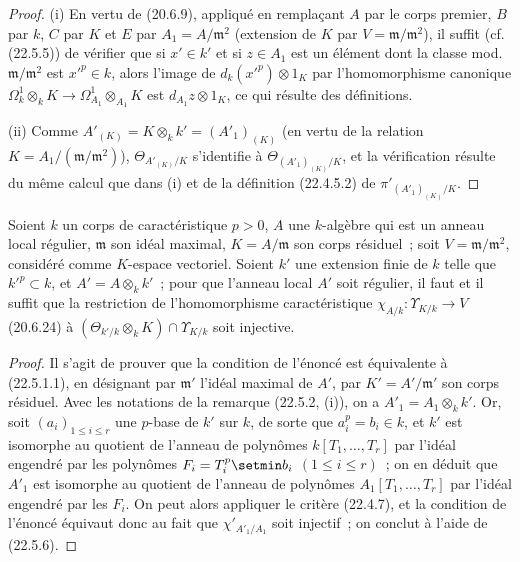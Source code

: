 \begin{proof}
(i) En vertu de (20.6.9), appliqué en remplaçant $A$ par le corps premier, $B$
par $k$, $C$ par $K$ et $E$ par $A_1=A/\mathfrak m^2$ (extension de $K$ par
$V=\mathfrak m/\mathfrak m^2$), il suffit (cf. (22.5.5)) de vérifier que si
$x'\in k'$ et si $z\in A_1$ est un élément dont la classe mod.
$\mathfrak m/\mathfrak m^2$ est $x'^p\in k$, alors l'image de
$d_k(x'^p)\otimes1_K$ par l'homomorphisme canonique
$\Omega^1_k\otimes_kK\longrightarrow\Omega^1_{A_1}\otimes_{A_1}K$ est
$d_{A_1}z\otimes1_K$, ce qui résulte des définitions.

(ii) Comme $A'_{(K)}=K\otimes_kk'=(A'_1)_{(K)}$ (en vertu de la relation
$K=A_1/(\mathfrak m/\mathfrak m^2)$), $\Theta_{A'_{(K)}/K}$ s'identifie à
$\Theta_{(A'_1)_{(K)}/K}$, et la vérification résulte du même calcul que dans
(i) et de la définition (22.4.5.2) de $\pi'_{(A'_1)_{(K)}/K}$.
\end{proof}

\begin{proposition}[22.5.7]
\label{0.22.5.7-fr}
Soient $k$ un corps de caractéristique $p>0$, $A$ une $k$-algèbre qui est un
anneau local régulier, $\mathfrak m$ son idéal maximal, $K=A/\mathfrak m$ son
corps résiduel~; soit $V=\mathfrak m/\mathfrak m^2$, considéré comme
$K$-espace vectoriel. Soient $k'$ une extension finie de $k$ telle que
$k'^p\subset k$, et $A'=A\otimes_kk'$~; pour que l'anneau local $A'$ soit
régulier, il faut et il suffit que la restriction de l'homomorphisme
caractéristique $\chi_{A/k}:\Upsilon_{K/k}\longrightarrow V$ \textup{(20.6.24)} à
$(\Theta_{k'/k}\otimes_kK)\cap\Upsilon_{K/k}$ soit injective.
\end{proposition}

\begin{proof}
Il s'agit de prouver que la condition de l'énoncé est équivalente à
(22.5.1.1), en désignant par $\mathfrak m'$ l'idéal maximal de $A'$, par
$K'=A'/\mathfrak m'$ son corps résiduel. Avec les notations de la remarque
(22.5.2, (i)), on a $A'_1=A_1\otimes_kk'$. Or, soit
$(a_i)_{1\leqslant i\leqslant r}$ une $p$-base de $k'$ sur $k$, de sorte que
$a_i^p=b_i\in k$, et $k'$ est isomorphe au quotient de l'anneau de
polynômes $k[T_1,\ldots,T_r]$ par l'idéal engendré par les polynômes
$F_i=T_i^p\setmin b_i$ $(1\leqslant i\leqslant r)$~; on en déduit que $A'_1$ est
isomorphe au quotient de l'anneau de polynômes $A_1[T_1,\ldots,T_r]$ par
l'idéal engendré par les $F_i$. On peut alors appliquer le critère (22.4.7), et
la condition de l'énoncé équivaut donc au fait que $\chi'_{A'_1/A_1}$ soit
injectif~; on conclut à l'aide de (22.5.6).
\end{proof}

